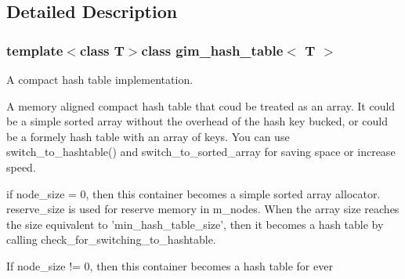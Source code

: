 \subsection{Detailed Description}
\subsubsection*{template$<$class T$>$class gim\+\_\+hash\+\_\+table$<$ T $>$}

A compact hash table implementation. 

A memory aligned compact hash table that coud be treated as an array. It could be a simple sorted array without the overhead of the hash key bucked, or could be a formely hash table with an array of keys. You can use switch\+\_\+to\+\_\+hashtable() and switch\+\_\+to\+\_\+sorted\+\_\+array for saving space or increase speed. 


\begin{DoxyItemize}
\item if node\+\_\+size = 0, then this container becomes a simple sorted array allocator. reserve\+\_\+size is used for reserve memory in m\+\_\+nodes. When the array size reaches the size equivalent to 'min\+\_\+hash\+\_\+table\+\_\+size', then it becomes a hash table by calling check\+\_\+for\+\_\+switching\+\_\+to\+\_\+hashtable. 
\item If node\+\_\+size != 0, then this container becomes a hash table for ever 
\end{DoxyItemize}

